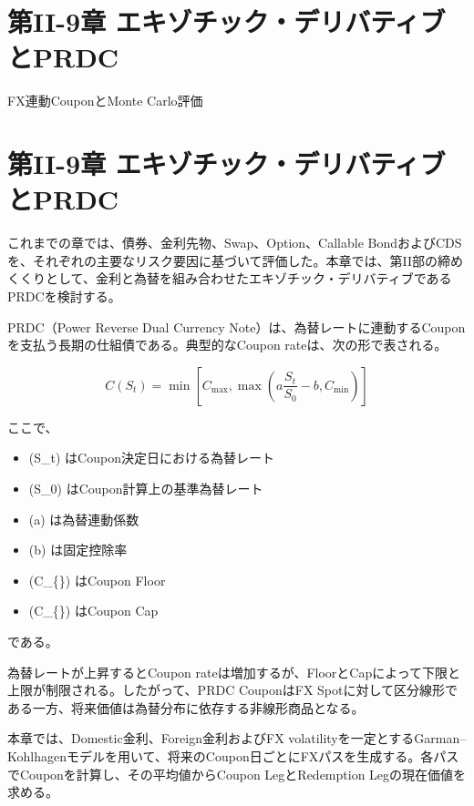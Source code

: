 \documentclass[
  letterpaper,
  DIV=11,
  numbers=noendperiod]{scrreprt}
\providecommand{\tightlist}{%
  \setlength{\itemsep}{0pt}\setlength{\parskip}{0pt}}
\begin{document}
\chapter{第II-9章
エキゾチック・デリバティブとPRDC}\label{ux7b2cii-9ux7ae0-ux30a8ux30adux30beux30c1ux30c3ux30afux30c7ux30eaux30d0ux30c6ux30a3ux30d6ux3068prdc}

FX連動CouponとMonte Carlo評価

\hfill\break

\chapter{第II-9章
エキゾチック・デリバティブとPRDC}\label{ux7b2cii-9ux7ae0-ux30a8ux30adux30beux30c1ux30c3ux30afux30c7ux30eaux30d0ux30c6ux30a3ux30d6ux3068prdc-1}

これまでの章では、債券、金利先物、Swap、Option、Callable
BondおよびCDSを、それぞれの主要なリスク要因に基づいて評価した。本章では、第II部の締めくくりとして、金利と為替を組み合わせたエキゾチック・デリバティブであるPRDCを検討する。

PRDC（Power Reverse Dual Currency
Note）は、為替レートに連動するCouponを支払う長期の仕組債である。典型的なCoupon
rateは、次の形で表される。

\[
C(S_t)
=
\min
\left[
C_{\max},
\max
\left(
a\frac{S_t}{S_0}-b,
C_{\min}
\right)
\right]
\]

ここで、

\begin{itemize}
\tightlist
\item
  (S\_t) はCoupon決定日における為替レート
\item
  (S\_0) はCoupon計算上の基準為替レート
\item
  (a) は為替連動係数
\item
  (b) は固定控除率
\item
  (C\_\{\min\}) はCoupon Floor
\item
  (C\_\{\max\}) はCoupon Cap
\end{itemize}

である。

為替レートが上昇するとCoupon
rateは増加するが、FloorとCapによって下限と上限が制限される。したがって、PRDC
CouponはFX
Spotに対して区分線形である一方、将来価値は為替分布に依存する非線形商品となる。

本章では、Domestic金利、Foreign金利およびFX
volatilityを一定とするGarman--Kohlhagenモデルを用いて、将来のCoupon日ごとにFXパスを生成する。各パスでCouponを計算し、その平均値からCoupon
LegとRedemption Legの現在価値を求める。
\end{document}
